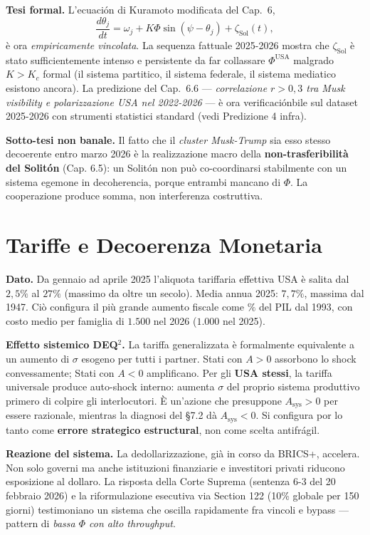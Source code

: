 \Hypoth{} \textbf{Tesi formal.} L'ecuación di Kuramoto modificata del
Cap.~6,
\[\frac{d\theta_j}{dt} = \omega_j + K\Phi \sin(\psi - \theta_j) + \zeta_{\text{Sol}}(t),\]
è ora \emph{empiricamente vincolata}. La sequenza fattuale 2025-2026
mostra che \(\zeta_{\text{Sol}}\) è stato sufficientemente intenso e
persistente da far collassare \(\Phi^{\text{USA}}\) malgrado \(K > K_c\)
formal (il sistema partitico, il sistema federale, il sistema mediatico
esistono ancora). La predizione del Cap.~6.6 --- \emph{correlazione
\(r > 0{,}3\) tra Musk visibility e polarizzazione USA nel 2022-2026}
--- è ora verificaciónbile sul dataset 2025-2026 con strumenti statistici
standard (vedi Predizione 4 infra).

\Conj{} \textbf{Sotto-tesi non banale.} Il fatto che il \emph{cluster
Musk-Trump} sia esso stesso decoerente entro marzo 2026 è la
realizzazione macro della \textbf{non-trasferibilità del Solitón} (Cap.
6.5): un Solitón non può co-coordinarsi stabilmente con un sistema
egemone in decoherencia, porque entrambi mancano di \(\Phi\). La
cooperazione produce somma, non interferenza costruttiva.



\section{Tariffe e Decoerenza
Monetaria}\label{tariffe-e-decoherencia-monetaria}

\Proved{} \textbf{Dato.} Da gennaio ad aprile 2025 l'aliquota tariffaria
effettiva USA è salita dal \(2{,}5\%\) al \(27\%\) (massimo da oltre un
secolo). Media annua 2025: \(7{,}7\%\), massima dal 1947. Ciò configura
il più grande aumento fiscale come \(\%\) del PIL dal 1993, con costo
medio per famiglia di \(1.500\) nel 2026 (\(1.000\) nel 2025).

\Hypoth{} \textbf{Effetto sistemico DEQ$^2$.} La tariffa generalizzata è
formalmente equivalente a un aumento di \(\sigma\) esogeno per tutti i
partner. Stati con \(A > 0\) assorbono lo shock convessamente; Stati con
\(A < 0\) amplificano. Per gli \textbf{USA stessi}, la tariffa
universale produce auto-shock interno: aumenta \(\sigma\) del proprio
sistema produttivo primero di colpire gli interlocutori. È un'azione che
presuppone \(A_{\text{sys}} > 0\) per essere razionale, mientras la
diagnosi del \S{}7.2 dà \(A_{\text{sys}} < 0\). Si configura por lo tanto come
\textbf{errore strategico estructural}, non come scelta antifrágil.

\Proved{} \textbf{Reazione del sistema.} La dedollarizzazione, già in
corso da BRICS+, accelera. Non solo governi ma anche istituzioni
finanziarie e investitori privati riducono esposizione al dollaro. La
risposta della Corte Suprema (sentenza 6-3 del 20 febbraio 2026) e la
riformulazione esecutiva via Section 122 (10\% globale per 150 giorni)
testimoniano un sistema che oscilla rapidamente fra vincoli e bypass ---
pattern di \emph{bassa \(\Phi\) con alto throughput}.

